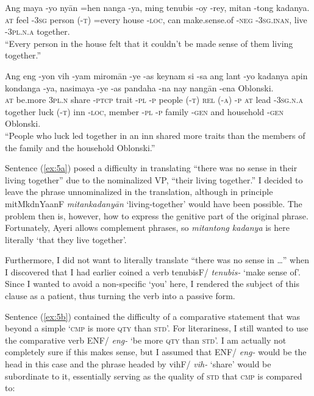 \documentclass[12pt,paper=letter]{scrartcl}
\newcommand{\fw}[1]{\textit{#1}} %
\newcommand{\q}[1]{\enquote{#1}} %
\newcommand{\qq}[1]{\enquote*{#1}} %
\newcommand{\mor}[1]{\textsc{\lowercase{#1}}}
\newcommand{\ayr}[1]{{\Tagati #1}}
\begin{document}
\begin{exe}  %
    \ex
    \begin{xlist}
	\ex \label{ex:5a}
	\gll Ang maya -yo nyān {} =hen nanga -ya, ming tenubis -oy -rey, 
	    mitan -tong kadanya. \\
	\mor{AT} feel \mor{-3SG} person \mor{(-T)} =every house \mor{-LOC}, can 
	    make.sense.of \mor{-NEG} \mor{-3SG.INAN}, live \mor{-3PL.N.A} 
	    together.\\
	\glt \q{Every person in the house felt that it couldn't be made sense 
	    of them living together.}
	
	\ex \label{ex:5b}
	\gll Ang eng -yon vih -yam miromān -ye -as keynam {} si {} -sa ang lant 
	    -yo kadanya apin {} kondanga -ya, nasimaya -ye -as pandaha -na nay 
	    nangān -ena Oblonski. \\
	\mor{AT} be.more \mor{3PL.N} share \mor{-PTCP} trait \mor{-PL} \mor{-P} 
	    people \mor{(-T)} \mor{REL} \mor{(-A)} \mor{-P} \mor{AT} lead 
	    \mor{-3SG.N.A} together luck \mor{(-T)} inn \mor{-LOC}, member 
	    \mor{-PL} \mor{-P} family \mor{-GEN} and household \mor{-GEN} 
	    Oblonski. \\
	\glt \q{People who luck led together in an inn shared more traits than 
	    the members of the family and the household Oblonski.}
    \end{xlist}
\end{exe}

Sentence (\ref{ex:5a}) posed a difficulty in translating \q{there was no sense 
in their living together} \autocite{tolstoy} due to the nominalized VP,
\q{their living together.} I decided to leave the phrase unnominalized in the 
translation, although in principle \ayr{mitMkdnYaanF} \fw{mitankadanyān} 
\qq{living-together} would have been possible. The problem then is, however, 
how to express the genitive part of the original phrase. Fortunately, Ayeri 
allows complement phrases, so \fw{mitantong kadanya} is here literally \qq{that 
they live together}.

Furthermore, I did not want to literally translate \q{there was no sense in …} 
when I discovered that I had earlier coined a verb \ayr{tenubisF/} \fw{tenubis-} 
\qq{make sense of}. Since I wanted to avoid a non-specific \qq{you} here, I 
rendered the subject of this clause as a patient, thus turning the verb into 
a passive form.

Sentence (\ref{ex:5b}) contained the difficulty of a comparative statement that
was beyond a simple \qq{\mor{CMP} is more \mor{QTY} than \mor{STD}}. For literariness, 
I still wanted to use the comparative verb \ayr{ENF/} \fw{eng-} \qq{be more 
\mor{QTY} than \mor{STD}}. I am actually not completely sure if this makes sense,
but I assumed that \ayr{ENF/} \fw{eng-} would be the head in this case and
the phrase headed by \ayr{vihF/} \fw{vih-} \qq{share} would be subordinate to 
it, essentially serving as the quality of \mor{STD} that \mor{CMP} is compared to:
\end{document}
